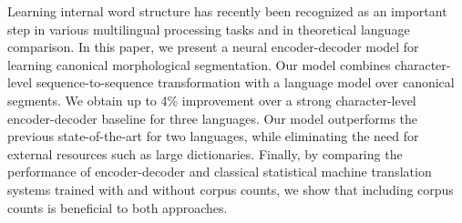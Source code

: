 Learning internal word structure has recently been recognized as an important step in various multilingual processing tasks and in theoretical language comparison. In this paper, we present a neural encoder-decoder model for learning canonical morphological segmentation. Our model combines character-level sequence-to-sequence transformation with a language model over canonical segments. We obtain up to 4\% improvement over a strong character-level encoder-decoder baseline for three languages. Our model outperforms the previous state-of-the-art for two languages, while eliminating the need for external resources such as large dictionaries. Finally, by comparing the performance of encoder-decoder and classical statistical machine translation systems trained with and without corpus counts, we show that including corpus counts is beneficial to both approaches.
